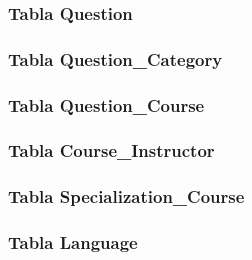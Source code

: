 \documentclass[../main.tex]{subfiles}
\begin{document}
\begin{database}
  \subsubsection{Tabla Question}
  
  \begin{table}
  \end{table}
  
  \subsubsection{Tabla Question\_Category}
  
  \begin{table}
  \end{table}
  
  \subsubsection{Tabla Question\_Course}
  
  \begin{table}
  \end{table}
  
  \subsubsection{Tabla Course\_Instructor}
  
  \begin{table}
  \end{table}
  
  \subsubsection{Tabla Specialization\_Course}
  
  \begin{table}
  \end{table}
  
  \subsubsection{Tabla Language}
  

\end{database}
\end{document}
